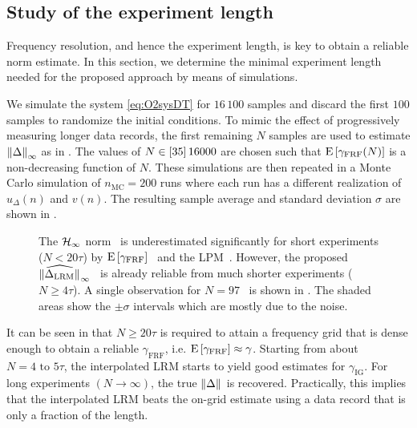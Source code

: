 \subsection{Study of the experiment length}
Frequency resolution, and hence the experiment length, is key to obtain a reliable \Hinf{} norm estimate.
In this section, we determine the minimal experiment length needed for the proposed approach by means of simulations.

We simulate the system \eqref{eq:O2sysDT} for $16\,100$ samples and discard the first $100$ samples to randomize the initial conditions.
To mimic the effect of progressively measuring longer data records, the first remaining $N$ samples are used to estimate $\infnorm{\Delta}$ as in .
The values of $N \in \ClosedInterval{35}{16 000}$ are chosen such that $\expectedValue{\gamma_{\mathrm{FRF}}(N)}$ is a non-decreasing function of $N$.
These simulations are then repeated in a Monte Carlo simulation of $n_{\mathrm{MC}}=200$ runs where each run has a different realization of  $u_{\Delta}(n)$ and $v(n)$.
The resulting sample average and standard deviation $\sigma$ are shown in .

\begin{figure}
  \centering
  \setlength{\figurewidth}{0.75\columnwidth}
  \setlength{\figureheight}{0.68\figurewidth}
  
  \caption{The $\Hinf{}$ norm~ is underestimated significantly for short experiments ($N<20\tau$) by $\expectedValue{\gamma_{\mathrm{FRF}}}$~ and the \gls{LPM}~.
  However, the proposed $\widehat{\norm[]{\Delta_{\mathrm{LRM}}}}_{\infty}$~ is already reliable from much shorter experiments ($N \geq 4 \tau$). A single observation for $N=97$~ is shown in . The shaded areas show the $\pm \sigma$ intervals which are mostly due to the noise.
  }
\label{fig:MC-run-length}
\end{figure}

It can be seen in  that $N \geq 20\tau$ is required to attain a frequency grid that is dense enough to obtain a reliable $\gamma_{\mathrm{FRF}}$, i.e. $\expectedValue{\gamma_{\mathrm{FRF}}} \approx \gamma$.
Starting from about $N=4 \text{ to } 5\tau$, the interpolated \gls{LRM} starts to yield good estimates for $\gamma_{\mathrm{IG}}$.
For long experiments $(N \to \infty)$, the true $\norm{\Delta}$ is recovered.
Practically, this implies that the interpolated \gls{LRM} beats the on-grid estimate using a data record that is only a fraction of the length.

